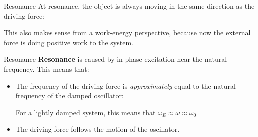 \documentclass[12pt,compress,aspectratio=169]{beamer}
\begin{document}
\begin{frame}{Resonance}
  At resonance, the object is always moving in the same direction as the
  driving force:

  \vspace{-.3in}{\large
    \begin{align*}
      v(t)&=A\omega_E\cos(\omega_E t)\\
      F_E(t)&=F\cos(\omega_E t)
    \end{align*}
  }

  This also makes sense from a work-energy perspective, because now the
  external force is doing positive work to the system.
\end{frame}



\begin{frame}{Resonance}
  \textbf{Resonance} is caused by in-phase excitation near the natural
  frequency. This means that:
  \begin{itemize}
  \item The frequency of the driving force is \emph{approximately} equal to the
    natural frequency of the damped oscillator:


    For a lightly damped system, this means that
    $\omega_E\approx\omega\approx\omega_0$
  \item The driving force follows the motion of the oscillator.
  \end{itemize}
\end{frame}
\end{document}

